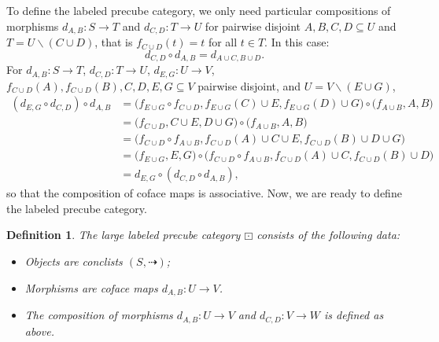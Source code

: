 \documentclass[11pt,a4paper,oldfontcommands]{memoir}
\newtheorem{definition}{Definition}
\begin{document}
To define the labeled precube category, we only need particular compositions of morphisms  $d_{A, B}: S \rightarrow T$ and $d_{C, D}: T \rightarrow U$ for pairwise disjoint $A, B, C, D \subseteq U$ and $T=U \backslash(C \cup D)$, that is $f_{C \cup D}(t)=t$ for all $t\in T$. In this case:
$$
d_{C, D} \circ d_{A, B}=d_{A \cup C, B \cup D}.
$$
For $d_{A, B}: S \rightarrow T$, $d_{C, D}: T \rightarrow U$, $d_{E, G}: U \rightarrow V$, $f_{C \cup D}(A), f_{C \cup D}(B),C, D, E, G \subseteq V$ pairwise disjoint, and $U=V \backslash(E \cup G)$,%
\begin{align*}
    ( d_{E, G} \circ d_{C, D} ) \circ d_{A, B}  & = \bigl(f_{E \cup G} \circ f_{C\cup D},f_{E \cup G}(C) \cup E, f_{E \cup G}(D)\cup G \bigl) \circ \bigl(f_{A \cup B},A,B \bigl) \\ %
    & = \bigl( f_{C\cup D},C \cup E, D\cup G \bigl) \circ \bigl(f_{A \cup B},A,B \bigl) \\ %
    & = \bigl( f_{C\cup D} \circ f_{A \cup B},  f_{C\cup D}(A) \cup C \cup E ,  f_{C\cup D}(B) \cup D \cup G \bigl) \\ %
    & = \bigl(f_{E\cup G},E,G \bigl) \circ \bigl( f_{C\cup D} \circ f_{A \cup B},  f_{C\cup D}(A) \cup C ,  f_{C\cup D}(B) \cup D  \bigl)  \\ %
    & = d_{E, G} \circ (d_{C, D}  \circ d_{A, B}),
\end{align*}
so that the composition of coface maps is associative. Now, we are ready to define the labeled precube category.
\begin{definition}
The large labeled precube category $\boxdot$ consists of the following data:
\begin{itemize}
  \item Objects are conclists $(S,\dashrightarrow)$;
 \item Morphisms are coface maps $d_{A,B} : U\rightarrow V$. %
  \item The composition of morphisms $d_{A, B}: U \rightarrow V$ and $d_{C, D}: V \rightarrow W$ is defined as above.
\end{itemize}
\end{definition}
\end{document}
